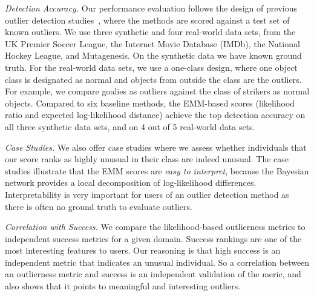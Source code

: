{{\em Detection Accuracy.} Our performance evaluation follows the design of previous outlier detection studies~\citep{Gao2010,aggarwal2013},
where the methods are scored against a test set of known outliers.  
%
We use three synthetic and four real-world data sets, from the UK Premier Soccer League, the Internet Movie Database (IMDb), the National Hockey League, and Mutagenesis. On the synthetic data we have known ground truth. For the real-world data sets, we use a one-class design, where one object class is designated as normal and objects from outside the class are the outliers. For example, we compare goalies as outliers against the class of strikers as normal objects. 
Compared to six baseline methods, the EMM-based scores (likelihood ratio and expected log-likelihood distance) achieve the top detection accuracy on all three synthetic data sets, and on 4 out of 5 real-world data sets.

{\em Case Studies.} We also offer case studies where we assess whether individuals that our score ranks as highly unusual in their class are  indeed unusual. 
The case studies illustrate that the EMM scores are {\em easy to interpret}, because the Bayesian network provides a local decomposition of log-likelihood differences. Interpretability is very important for users of an outlier detection method as there is often no ground truth to 
evaluate outliers.%

{\em Correlation with Success.} We compare the likelihood-based outlierness metrics to independent success metrics for a given domain. Success rankings are one of the most interesting features to users. Our reasoning is that high success is an independent metric that indicates an unusual individual. So a correlation between an outlierness metric and success is an independent validation of the meric, and also shows that it points to meaningful and interesting outliers.

}
